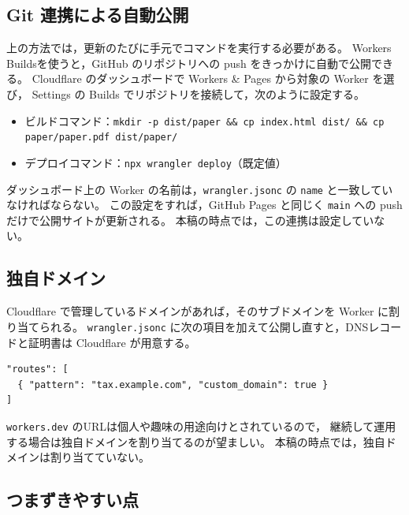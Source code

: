 \documentclass[paper=a4,fontsize=10pt]{jlreq}
\newcommand{\code}[1]{\texttt{#1}}
\begin{document}
\subsection{Git 連携による自動公開}

上の方法では，更新のたびに手元でコマンドを実行する必要がある。
Workers Builds\cite{cfbuilds}を使うと，GitHub のリポジトリへの push をきっかけに自動で公開できる。
Cloudflare のダッシュボードで Workers \& Pages から対象の Worker を選び，
Settings の Builds でリポジトリを接続して，次のように設定する。
\begin{itemize}
  \item ビルドコマンド：\code{mkdir -p dist/paper \&\& cp index.html dist/ \&\& cp paper/paper.pdf dist/paper/}
  \item デプロイコマンド：\code{npx wrangler deploy}（既定値）
\end{itemize}
ダッシュボード上の Worker の名前は，\code{wrangler.jsonc} の \code{name} と一致していなければならない。
この設定をすれば，GitHub Pages と同じく \code{main} への push だけで公開サイトが更新される。
本稿の時点では，この連携は設定していない。

\subsection{独自ドメイン}

Cloudflare で管理しているドメインがあれば，そのサブドメインを Worker に割り当てられる\cite{cfdomains}。
\code{wrangler.jsonc} に次の項目を加えて公開し直すと，DNSレコードと証明書は Cloudflare が用意する。
\begin{lstlisting}
"routes": [
  { "pattern": "tax.example.com", "custom_domain": true }
]
\end{lstlisting}
\code{workers.dev} のURLは個人や趣味の用途向けとされているので，
継続して運用する場合は独自ドメインを割り当てるのが望ましい。
本稿の時点では，独自ドメインは割り当てていない。

\subsection{つまずきやすい点}
\end{document}
